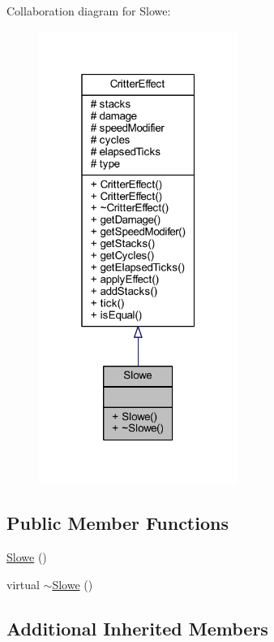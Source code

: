 Collaboration diagram for Slowe\+:\nopagebreak
\begin{figure}[H]
\begin{center}
\leavevmode
\includegraphics[width=184pt]{struct_slowe__coll__graph}
\end{center}
\end{figure}
\subsection*{Public Member Functions}
\begin{DoxyCompactItemize}
\item 
\hyperlink{struct_slowe_afb6b3b5a3322e8eefe31789e69270cb8}{Slowe} ()
\item 
virtual \hyperlink{struct_slowe_a29af66a89be468dd314ee265320f7b3c}{$\sim$\+Slowe} ()
\end{DoxyCompactItemize}
\subsection*{Additional Inherited Members}


